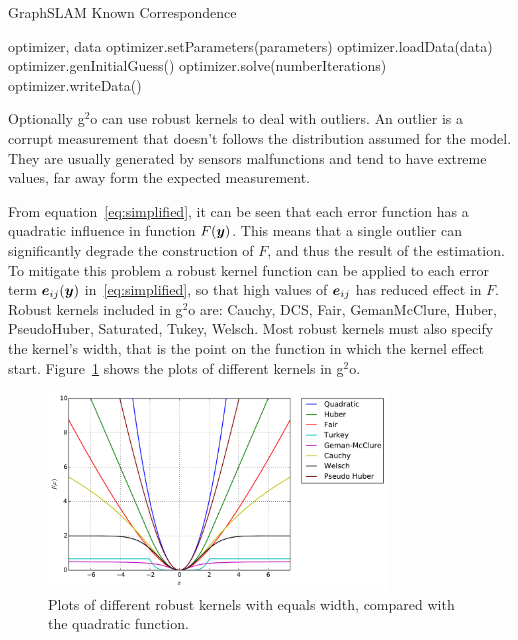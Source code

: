 \begin{algorithm}[htbp!]
    \caption{GraphSLAM Known Correspondence}
    \label{alg:known-correspondence}
    \begin{algorithmic}[1]
        \Require optimizer, data
        \State optimizer.setParameters(parameters)
        \State optimizer.loadData(data)
        \State optimizer.genInitialGuess()
        \State optimizer.solve(numberIterations)
        \State optimizer.writeData()
    \end{algorithmic}
\end{algorithm}

Optionally g$^2$o can use robust kernels to deal with outliers. An outlier is a corrupt measurement that doesn't follows the distribution assumed for the model. They are usually generated by sensors malfunctions and tend to have extreme values, far away form the expected measurement. 

From equation~\eqref{eq:simplified}, it can be seen that each error function has a quadratic influence in function $F(\boldsymbol{y})$. This means that a single outlier can significantly degrade the construction of $F$, and thus the result of the estimation. To mitigate this problem a robust kernel function can be applied to each error term $\boldsymbol{e}_{ij}(\boldsymbol{y})$ in~\eqref{eq:simplified}, so that high values of $\boldsymbol{e}_{ij}$ has reduced effect in $F$. Robust kernels included in g$^2$o are: Cauchy, DCS, Fair, GemanMcClure, Huber, PseudoHuber, Saturated, Tukey, Welsch. Most robust kernels must also specify the kernel's width, that is the point on the function in which the kernel effect start. Figure~\ref{fig:kernels} shows the plots of different kernels in g$^2$o. 

\begin{figure}[htbp!]
    \centering
    \includegraphics[width=0.8\textwidth]{imagenes/kernels.pdf}
    \caption{Plots of different robust kernels with equals width, compared with the quadratic function.}
    \label{fig:kernels}
\end{figure} 

